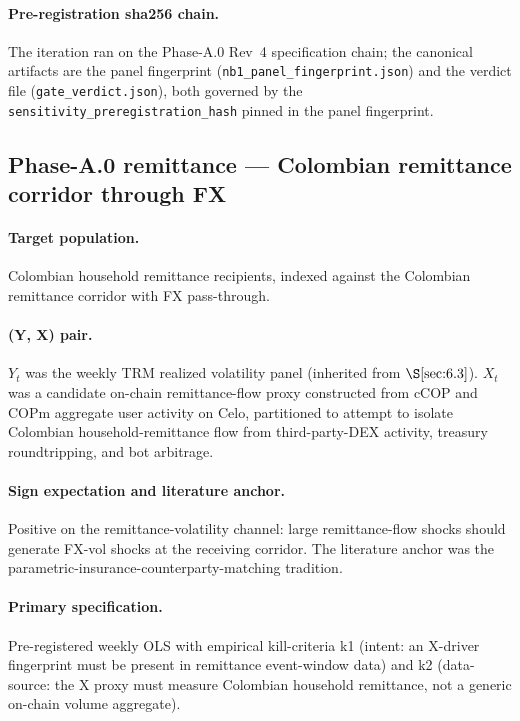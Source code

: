 \paragraph{Pre-registration sha256 chain.} The iteration ran on the
Phase-A.0 Rev~4 specification chain; the canonical artifacts are the
panel fingerprint
(\texttt{nb1\_panel\_fingerprint.json}) and the verdict file
(\texttt{gate\_verdict.json}), both governed by the
\texttt{sensitivity\_preregistration\_hash} pinned in the panel
fingerprint.

\subsection{Phase-A.0 remittance --- Colombian remittance corridor through
FX}\label{sec:6.4}

\paragraph{Target population.} Colombian household remittance recipients,
indexed against the Colombian remittance corridor with FX pass-through.

\paragraph{(Y, X) pair.} \(Y_t\) was the weekly TRM realized volatility
panel (inherited from \(\S\ref{sec:6.3}\)). \(X_t\) was a candidate
on-chain remittance-flow proxy constructed from cCOP and COPm aggregate
user activity on Celo, partitioned to attempt to isolate Colombian
household-remittance flow from third-party-DEX activity, treasury
roundtripping, and bot arbitrage.

\paragraph{Sign expectation and literature anchor.} Positive on the
remittance-volatility channel: large remittance-flow shocks should
generate FX-vol shocks at the receiving corridor. The literature anchor
was the parametric-insurance-counterparty-matching tradition.

\paragraph{Primary specification.} Pre-registered weekly OLS with
empirical kill-criteria k1 (intent: an X-driver fingerprint must be
present in remittance event-window data) and k2 (data-source: the X
proxy must measure Colombian household remittance, not a generic
on-chain volume aggregate).

